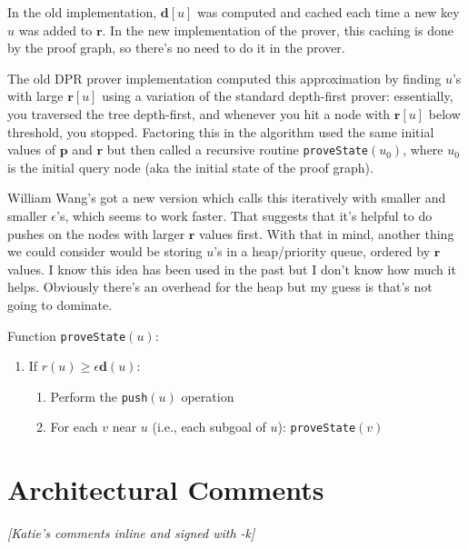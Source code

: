 \documentclass[12pt]{article}
\newcommand{\vek}[1]{\textbf{#1}}
\begin{document}
In the old implementation, $\vek{d}[u]$ was computed and cached each
time a new key $u$ was added to $\vek{r}$.  In the new implementation
of the prover, this caching is done by the proof graph, so there's no
need to do it in the prover.  

The old DPR prover implementation computed this approximation by
finding $u$'s with large $\vek{r}[u]$ using a variation of the
standard depth-first prover: essentially, you traversed the tree
depth-first, and whenever you hit a node with $\vek{r}[u]$ below
threshold, you stopped.  Factoring this in the algorithm used the same
initial values of $\vek{p}$ and $\vek{r}$ but then called a recursive
routine \texttt{proveState}$(u_0)$, where $u_0$ is the initial query
node (aka the initial state of the proof graph).

William Wang's got a new version which calls this iteratively with
smaller and smaller $\epsilon$'s, which seems to work faster.  That
suggests that it's helpful to do pushes on the nodes with larger
$\vek{r}$ values first.  With that in mind, another thing we could
consider would be storing $u$'s in a heap/priority queue, ordered by
$\vek{r}$ values.  I know this idea has been used in the past but I
don't know how much it helps.  Obviously there's an overhead for the
heap but my guess is that's not going to dominate.

\bigskip

\noindent Function \texttt{proveState}$(u)$:
\begin{enumerate}
\item If $r(u)\geq{}\epsilon \vek{d}(u)$:
  \begin{enumerate}
  \item Perform the \texttt{push}$(u)$ operation
  \item For each $v$ near $u$ (i.e., each subgoal of $u$): \texttt{proveState}$(v)$
  \end{enumerate}
\end{enumerate}


\section{Architectural Comments}

\emph{ [Katie's comments inline and signed with -k]}
\end{document}
